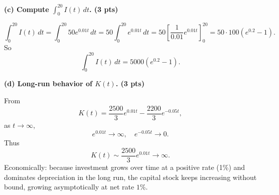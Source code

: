 \documentclass[12pt]{article}
\begin{document}
\textbf{(c) Compute \(\displaystyle \int_0^{20} I(t)\, dt\). (3 pts)}

\[
\int_0^{20} I(t)\, dt = \int_0^{20} 50 e^{0.01 t}\, dt
= 50 \int_0^{20} e^{0.01 t}\, dt
= 50 \left[\frac{1}{0.01} e^{0.01 t}\right]_0^{20}
= 50 \cdot 100 (e^{0.2} - 1).
\]
So
\[
\int_0^{20} I(t)\, dt = 5000 (e^{0.2} - 1).
\]

\textbf{(d) Long-run behavior of \(K(t)\). (3 pts)}

From
\[
K(t) = \frac{2500}{3} e^{0.01 t} - \frac{2200}{3} e^{-0.05 t},
\]
as \(t \to \infty\),
\[
e^{0.01 t} \to \infty,\quad e^{-0.05 t} \to 0.
\]
Thus
\[
K(t) \sim \frac{2500}{3} e^{0.01 t} \to \infty.
\]
Economically: because investment grows over time at a positive rate (1\%) and dominates depreciation in the long run, the capital stock keeps increasing without bound, growing asymptotically at net rate \(1\%\).
\end{document}
